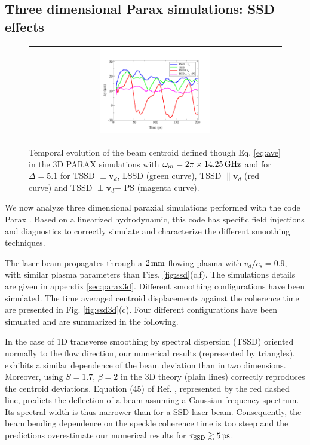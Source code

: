 \documentclass[%
 reprint,
 amsmath,amssymb,
 aps,
]{revtex4-1}
\begin{document}
\subsection{Three dimensional Parax simulations: SSD effects } \label{sec:fit3D}
\begin{figure}
\begin{tabular}{c}
\includegraphics[width=0.45\textwidth]{riazuello.png}
\end{tabular}
\caption{ \label{fig:riazuello}
Temporal evolution of the beam centroid defined though Eq. \eqref{eq:ave} in the 3D PARAX simulations with $\omega_m=2\pi\times 14.25\,\rm GHz$ and for $\Delta = 5.1$ for TSSD $\perp\mathbf{v}_d$, LSSD (green curve), TSSD $\parallel\mathbf{v}_d$ (red curve) and TSSD $\perp\mathbf{v}_d$+ PS (magenta curve).}
\end{figure}
We now analyze three dimensional paraxial simulations performed with the code Parax \cite[]{POP_Riazuelo_2000}. Based on a linearized hydrodynamic, this code has specific field injections and diagnostics to correctly simulate and characterize the different smoothing techniques. 

The laser beam propagates through a $2\,\rm mm$ flowing plasma with $v_d/c_s= 0.9$, with similar plasma parameters than Figs. \ref{fig:ssd}(c,f). The simulations details are given in appendix \ref{sec:parax3d}. Different smoothing configurations have been simulated. The time averaged centroid displacements against the coherence time are presented in Fig. \ref{fig:ssd3d}(c). Four different configurations have been simulated and are summarized in the following. 

In the case of  1D transverse smoothing by spectral dispersion (TSSD) oriented normally to the flow direction,  our numerical results (represented by triangles), exhibits a similar dependence of the beam deviation than in two dimensions. Moreover, using $S=1.7$, $\beta=2$ in the 3D theory (plain lines) correctly reproduces the centroid deviations.
Equation (45) of Ref. \cite[]{POP_Rose_Ghosal_98}, represented by the red dashed line, predicts the deflection of a beam assuming a Gaussian frequency spectrum. 
Its spectral width is thus narrower than for a SSD laser beam. Consequently, the beam bending dependence on the speckle coherence time is too steep and the predictions overestimate our numerical results for $\tau_\mathrm{SSD}\gtrsim 5\, \rm ps$.
\end{document}
